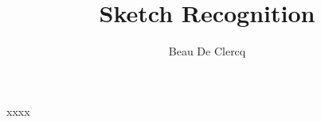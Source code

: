 \documentclass[]{article}
\title{Sketch Recognition}
\author{Beau De Clercq}
\begin{document}
\maketitle

\begin{abstract}

\end{abstract}

\section{}
xxxx\cite{onlinerecognition}


{}
\end{document}
